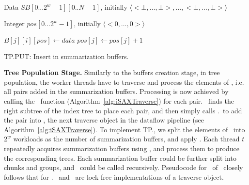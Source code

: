 \begin{algorithm}[t]
    \footnotesize
    \vspace*{2mm}
    
    \begin{algorithmic}[1]
    
        \State Data $\mathit{SB}[0...2^w-1][0..N-1]$, initially $\langle <\bot,\ldots,\bot>, \ldots, <\bot,\ldots,\bot> \rangle$
    \EndProcedure

    \vspace*{1mm}
    \vspace*{1mm}
    

    \State Integer $\mathit{pos}[0...2^w-1]$, initially  $\langle <0, \ldots, 0 >\rangle$
    
        \State $\mathit{B[j][i][pos]} \gets \mathit{data}$  
        \State $\mathit{pos[j]} \gets \mathit{pos[j]} + 1$  
    \EndProcedure
    
    \end{algorithmic}
    
    \caption{TP.PUT: Insert in summarization  buffers.}
    \label{alg:sb}
\end{algorithm}


\noindent
{\bf Tree Population Stage.}
Similarly to the buffers creation stage, in tree population, the worker threads
have to traverse and process the elements of \TP, i.e. all pairs added in the summarization
buffers. Processing is now achieved by calling the \TreePopulation\ function 
(Algorithm~\ref{alg:iSAXTraverse}) for each pair. \TreePopulation\ finds the right subtree
of the index tree to place each pair, and then simply calls \PS.\Put\ to add the pair into
\PS, the next traverse object in the dataflow pipeline (see Algorithm~\ref{alg:iSAXTraverse}). 
To implement TP.\Traverse, we split the elements of \TP\ into $2^w$ workloads 
as the number of summarization buffers, and apply \Refresh.
Each thread $\mathit{t}$ repeatedly acquires summarization buffers using \FAI,
and process them to produce the corresponding trees. 
Each summarization buffer could be further split into chunks and groups, and
\Refresh\ could be called recursively.
Pseudocode for \Traverse\ of \TP\ closely follows that for \BC.
\BC\ and \TP\ are lock-free implementations of a traverse object. 

